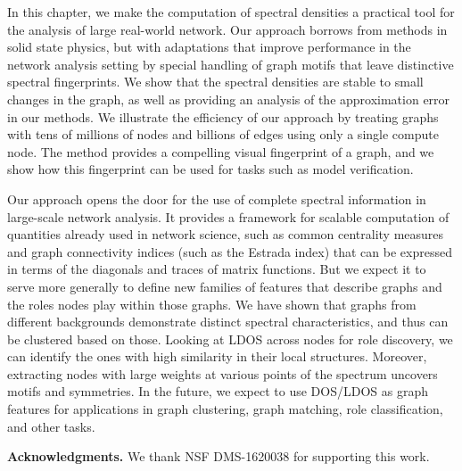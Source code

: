 In this chapter, we make the computation of spectral densities a practical tool
for the analysis of large real-world network. Our approach borrows from methods
in solid state physics, but with adaptations that improve performance in the
network analysis setting by special handling of graph motifs that leave
distinctive spectral fingerprints. We show that the spectral densities are
stable to small changes in the graph, as well as providing an analysis of the
approximation error in our methods. We illustrate the efficiency of our
approach by treating graphs with tens of millions of nodes and billions of edges
using only a single compute node. The method provides a compelling visual
fingerprint of a graph, and we show how this fingerprint can be used for tasks
such as model verification.

Our approach opens the door for the use of complete spectral information in
large-scale network analysis. It provides a framework for scalable computation
of quantities already used in network science, such as common centrality
measures and graph connectivity indices (such as the Estrada index) that can be
expressed in terms of the diagonals and traces of matrix functions. But we
expect it to serve more generally to define new families of features that
describe graphs and the roles nodes play within those graphs. We have shown that
graphs from different backgrounds demonstrate distinct spectral
characteristics, and thus can be clustered based on those. Looking at LDOS
across nodes for role discovery, we can identify the ones with high similarity
in their local structures. Moreover, extracting nodes with large weights at
various points of the spectrum uncovers motifs and symmetries. In the future, we
expect to use DOS/LDOS as graph features for applications in graph clustering,
graph matching, role classification, and other tasks.

\noindent\textbf{Acknowledgments.} We thank NSF DMS-1620038 for supporting this
work.